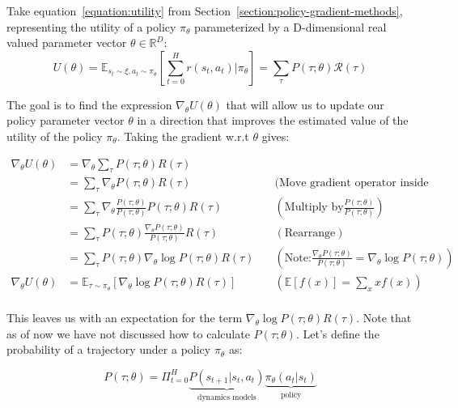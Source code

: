 \documentclass{../main.tex}{}
\begin{document}
Take equation~\ref{equation:utility} from Section~\ref{section:policy-gradient-methods}, representing the utility of a policy $\pi_{\theta}$ parameterized by a D-dimensional real valued parameter vector $\theta \in \mathbb{R}^D$:
\begin{equation}
U(\theta) = \mathbb{E}_{s_t \sim \xi, a_t \sim \pi_{\theta}}[\sum_{t=0}^{H}r(s_t, a_t) | \pi_{\theta}] = \sum_{\tau}P(\tau ; \theta)\mathcal{R}(\tau)
\end{equation}

The goal is to find the expression $\nabla_{\theta} U(\theta)$ that will allow us to update our policy parameter vector $\theta$ in a direction that improves the estimated value of the utility of the policy $\pi_{\theta}$. Taking the gradient w.r.t $\theta$ gives:

\begin{equation}\label{equation:expectance-gradient}
\begin{aligned}
\nabla_{\theta} U(\theta) & = \nabla_{\theta} \sum_{\tau}P(\tau ; \theta) R(\tau) \\
& =  \sum_{\tau} \nabla_{\theta} P(\tau ; \theta) R(\tau) \quad &\text{(Move gradient operator inside sum)} \\
& =  \sum_{\tau} \nabla_{\theta} \frac{P(\tau; \theta)}{P(\tau ; \theta)} P(\tau ; \theta) R(\tau) \quad & (\text{Multiply by} \frac{P(\tau; \theta)}{P(\tau ; \theta)}  )  \\
& =  \sum_{\tau} P(\tau; \theta) \frac{\nabla_{\theta} P(\tau ; \theta)}{P(\tau ; \theta)} R(\tau) \quad & (\text{Rearrange}) \\
& =  \sum_{\tau} P(\tau; \theta) \nabla_{\theta} \log P(\tau ; \theta) R(\tau) \quad & (\text{Note:} \frac{\nabla_{\theta}P(\tau; \theta)}{P(\tau; \theta)} = \nabla_{\theta} \log P(\tau; \theta) ) \\
\nabla_{\theta} U(\theta) & = \mathbb{E}_{\tau \sim \pi_{\theta}} [\nabla_{\theta} \log P(\tau ; \theta) R(\tau)] & (\mathbb{E}[f(x)] = \sum_{x} xf(x))\\
\end{aligned}
\end{equation}

This leaves us with an expectation for the term $\nabla_{\theta} \log P(\tau ; \theta) R(\tau)$. Note that as of now we have not discussed how to calculate $P(\tau ; \theta)$. Let's define the probability of a trajectory under a policy $\pi_{\theta}$ as: 

\begin{equation}
P (\tau; \theta) = \Pi_{t=0}^{H} \underbrace{P (s_{t+1} | s_t, a_t)}_\textrm{dynamics models} \underbrace{\pi_{\theta} (a_t | s_t)}_\textrm{policy}
\end{equation}
\end{document}
